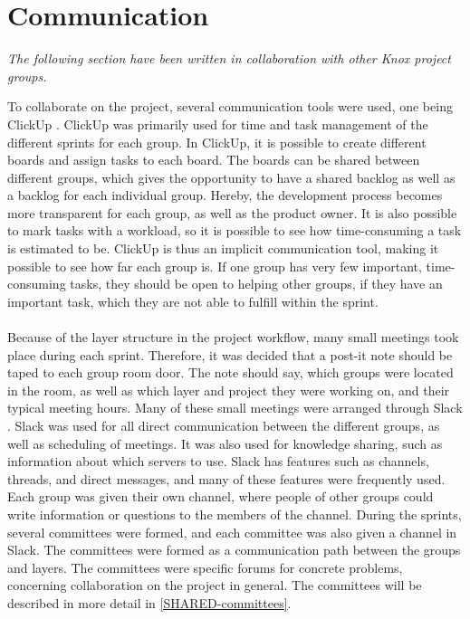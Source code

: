 \section{Communication}\label{communication_in_knox}
\textit{The following section have been written in collaboration with other Knox project groups.}


To collaborate on the project, several communication tools were used, one being ClickUp \cite{clickup}. ClickUp was primarily used for time and task management of the different sprints for each group. In ClickUp, it is possible to create different boards and assign tasks to each board. The boards can be shared between different groups, which gives the opportunity to have a shared backlog as well as a backlog for each individual group. Hereby, the development process becomes more transparent for each group, as well as the product owner. It is also possible to mark tasks with a workload, so it is possible to see how time-consuming a task is estimated to be. ClickUp is thus an implicit communication tool, making it possible to see how far each group is. If one group has very few important, time-consuming tasks, they should be open to helping other groups, if they have an important task, which they are not able to fulfill within the sprint.
\\\\
Because of the layer structure in the project workflow, many small meetings took place during each sprint. Therefore, it was decided that a post-it note should be taped to each group room door. The note should say, which groups were located in the room, as well as which layer and project they were working on, and their typical meeting hours. 
Many of these small meetings were arranged through Slack \cite{slack}. Slack was used for all direct communication between the different groups, as well as scheduling of meetings. It was also used for knowledge sharing, such as information about which servers to use. Slack has features such as channels, threads, and direct messages, and many of these features were frequently used. Each group was given their own channel, where people of other groups could write information or questions to the members of the channel. During the sprints, several committees were formed, and each committee was also given a channel in Slack. The committees were formed as a communication path between the groups and layers. The committees were specific forums for concrete problems, concerning collaboration on the project in general. The committees will be described in more detail in \ref{SHARED-committees}.
